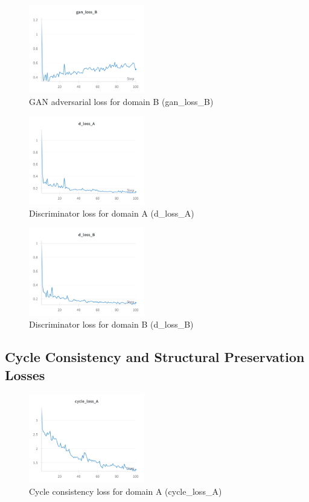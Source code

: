 \documentclass[twocolumn,superscriptaddress,aps]{revtex4-1}
\begin{document}
\begin{figure}[H]
\centering
\includegraphics[width=0.45\textwidth]{assets/gan_loss_B.png}
\caption{GAN adversarial loss for domain B (gan\_loss\_B)}
\label{fig:gan_loss_B}
\end{figure}

\begin{figure}[H]
\centering
\includegraphics[width=0.45\textwidth]{assets/d_loss_A.png}
\caption{Discriminator loss for domain A (d\_loss\_A)}
\label{fig:d_loss_A}
\end{figure}

\begin{figure}[H]
\centering
\includegraphics[width=0.45\textwidth]{assets/d_loss_B.png}
\caption{Discriminator loss for domain B (d\_loss\_B)}
\label{fig:d_loss_B}
\end{figure}

\subsection{Cycle Consistency and Structural Preservation Losses}

\begin{figure}[H]
\centering
\includegraphics[width=0.45\textwidth]{assets/cycle_loss_A.png}
\caption{Cycle consistency loss for domain A (cycle\_loss\_A)}
\label{fig:cycle_loss_A}
\end{figure}
\end{document}
